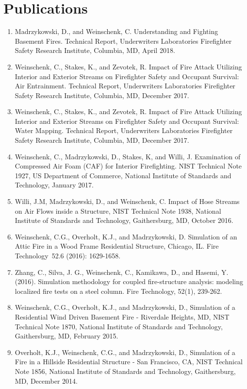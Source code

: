 \documentclass[10pt,letterpaper]{article}
\begin{document}
\clearpage

\section*{Publications}
\begin{enumerate}
\item Madrzykowski, D., and Weinschenk, C. Understanding and Fighting Basement Fires. Technical Report, Underwriters Laboratories Firefighter Safety Research Institute, Columbia, MD, April 2018.
\item Weinschenk, C., Stakes, K., and Zevotek, R. Impact of Fire Attack Utilizing Interior and Exterior Streams on Firefighter Safety and Occupant Survival: Air Entrainment. Technical Report, Underwriters Laboratories Firefighter Safety Research Institute, Columbia, MD, December 2017.
\item Weinschenk, C., Stakes, K., and Zevotek, R. Impact of Fire Attack Utilizing Interior and Exterior Streams on Firefighter Safety and Occupant Survival: Water Mapping. Technical Report, Underwriters Laboratories Firefighter Safety Research Institute, Columbia, MD, December 2017.
\item Weinschenk, C., Madrzykowski, D., Stakes, K, and Willi, J. Examination of Compressed Air Foam (CAF) for Interior Firefighting. NIST Technical Note 1927, US Department of Commerce, National Institute of Standards and Technology, January 2017.
\item Willi, J.M, Madrzykowski, D., and Weinschenk, C. Impact of Hose Streams on Air Flows inside a
Structure, NIST Technical Note 1938, National Institute of Standards and Technology, Gaithersburg, MD, October 2016.
\item Weinschenk, C.G., Overholt, K.J., and Madrzykowski, D. Simulation of an Attic Fire in a Wood Frame Residential Structure, Chicago, IL. Fire Technology 52.6 (2016): 1629-1658.
\item Zhang, C., Silva, J. G., Weinschenk, C., Kamikawa, D., and Hasemi, Y. (2016). Simulation methodology for coupled fire-structure analysis: modeling localized fire tests on a steel column. Fire Technology, 52(1), 239-262.
\item Weinschenk, C.G., Overholt, K.J., and Madrzykowski, D., Simulation of a Residential Wind Driven Basement Fire - Riverdale Heights, MD, NIST Technical Note 1870, National Institute of Standards and Technology, Gaithersburg, MD, February 2015.
\item Overholt, K.J., Weinschenk, C.G., and Madrzykowski, D., Simulation of a Fire in a Hillside Residential Structure - San Francisco, CA, NIST Technical Note 1856, National Institute of Standards and Technology, Gaithersburg, MD, December 2014.

\end{enumerate}
\end{document}
